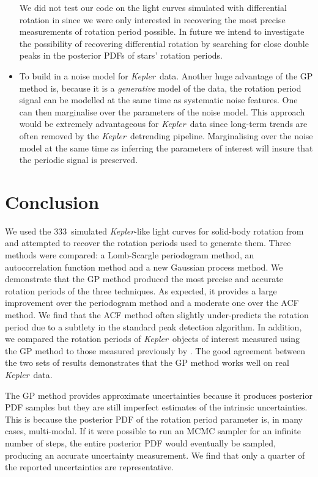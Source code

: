 \documentclass[useAMS, usenatbib, preprint, 12pt]{aastex}
\newcommand{\naigrain}{333}
\newcommand{\Kepler}{{\it Kepler}}
\newcommand{\kepler}{\Kepler}
\begin{document}
\begin{itemize}
{We did not test our code on the light curves simulated with differential
rotation in \citet{Aigrain2015} since we were only interested in recovering
the most precise measurements of rotation period possible.
In future we intend to investigate the possibility of recovering
differential rotation by searching for close double peaks in the posterior
PDFs of stars' rotation periods.}
\item{To build in a noise model for \kepler\ data.
Another huge advantage of the GP method is, because it is a {\it generative}
model of the data, the rotation period signal can be modelled at the same time
as systematic noise features.
One can then marginalise over the parameters of the noise model.
This approach would be extremely advantageous for \kepler\ data since
long-term trends are often removed by the \kepler\ detrending pipeline.
Marginalising over the noise model at the same time as inferring the
parameters of interest will insure that the periodic signal is preserved.}
\end{itemize}

\section{Conclusion}

We used the \naigrain\ simulated \kepler-like light curves for solid-body
rotation from \citet{Aigrain2015} and attempted to recover the rotation
periods used to generate them.
Three methods were compared: a Lomb-Scargle periodogram method, an
autocorrelation function method and a new Gaussian process method.
We demonstrate that the GP method produced the most precise and accurate
rotation periods of the three techniques.
As expected, it provides a large improvement over the periodogram method and a
moderate one over the ACF method.
We find that the ACF method often slightly under-predicts the rotation period
due to a subtlety in the standard peak detection algorithm.
In addition, we compared the rotation periods of \kepler\ objects of
interest measured using the GP method to those measured previously by
\citet{Mcquillan2014}.
The good agreement between the two sets of results demonstrates that the GP
method works well on real \kepler\ data.

The GP method provides approximate uncertainties because it produces posterior
PDF samples but they are still imperfect estimates of the intrinsic
uncertainties.
This is because the posterior PDF of the rotation period parameter is, in many
cases, multi-modal.
If it were possible to run an MCMC sampler for an infinite number of steps,
the entire posterior PDF would eventually be sampled, producing an accurate
uncertainty measurement.
We find that only a quarter of the reported uncertainties are representative.
\end{document}
